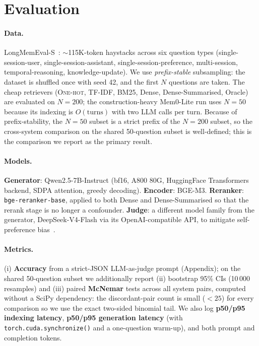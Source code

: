 \documentclass[11pt]{article}
\begin{document}
\section{Evaluation}
\label{sec:setup}

\paragraph{Data.}
LongMemEval-S~\citep{wu2024longmemeval}: $\sim$115K-token haystacks
across six question types (single-session-user,
single-session-assistant, single-session-preference, multi-session,
temporal-reasoning, knowledge-update). We use \emph{prefix-stable}
subsampling: the dataset is shuffled once with seed 42, and the
first $N$ questions are taken. The cheap retrievers
(\textsc{One-hot}, \textsc{TF-IDF}, BM25, Dense, Dense-Summarised,
Oracle) are evaluated on $N{=}200$; the construction-heavy Mem0-Lite
run uses $N{=}50$ because its indexing is $O(\text{turns})$ with two
LLM calls per turn. Because of prefix-stability, the $N{=}50$
subset is a strict prefix of the $N{=}200$ subset, so the
cross-system comparison on the shared 50-question subset is
well-defined; this is the comparison we report as the primary
result.

\paragraph{Models.}
\textbf{Generator}: Qwen2.5-7B-Instruct (bf16, A800 80G, HuggingFace
Transformers backend, SDPA attention, greedy decoding).
\textbf{Encoder}: BGE-M3. \textbf{Reranker}:
\texttt{bge-reranker-base}, applied to both Dense and
Dense-Summarised so that the rerank stage is no longer a confounder.
\textbf{Judge}: a different model family from the generator,
DeepSeek-V4-Flash via its OpenAI-compatible API, to mitigate
self-preference bias~\citep{panickssery2024selfpref}.

\paragraph{Metrics.}
(i) \textbf{Accuracy} from a strict-JSON LLM-as-judge
prompt (Appendix); on the shared 50-question subset we additionally
report (ii) bootstrap 95\% CIs (10\,000 resamples) and (iii) paired
\textbf{McNemar} tests across all system pairs, computed without a
SciPy dependency: the discordant-pair count is small ($<25$) for
every comparison so we use the exact two-sided binomial tail. We
also log \textbf{p50/p95 indexing latency},
\textbf{p50/p95 generation latency} (with
\texttt{torch.cuda.synchronize()} and a one-question warm-up), and
both prompt and completion tokens.
\end{document}
